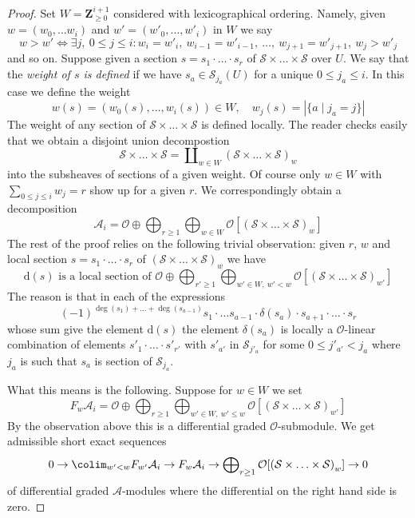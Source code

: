 \begin{proof}
\medskip\noindent
Set $W = \mathbf{Z}_{\geq 0}^{i + 1}$ considered with lexicographical
ordering. Namely, given $w = (w_0, \ldots w_i)$ and
$w' = (w'_0, \ldots, w'_i)$ in $W$ we say
$$
w > w' \Leftrightarrow
\exists j,\ 0 \leq j \leq i :
w_i = w'_i,\ w_{i - 1} = w'_{i - 1},\ \ldots ,
\ w_{j + 1} = w'_{j + 1},\ w_j > w'_j
$$
and so on. Suppose given a section
$s = s_1 \cdot \ldots \cdot s_r$ of
$\mathcal{S} \times \ldots \times \mathcal{S}$
over $U$. We say that the {\it weight of $s$ is defined}
if we have $s_a \in \mathcal{S}_{j_a}(U)$ for a unique
$0 \leq j_a \leq i$. In this case we define the weight
$$
w(s) = (w_0(s), \ldots, w_i(s)) \in W,\quad
w_j(s) = |\{a \mid j_a = j\}|
$$
The weight of any section of $\mathcal{S} \times \ldots \times \mathcal{S}$
is defined locally. The reader checks easily that we obtain a disjoint union
decompostion
$$
\mathcal{S} \times \ldots \times \mathcal{S} =
\coprod\nolimits_{w \in W} \left(
\mathcal{S} \times \ldots \times \mathcal{S}\right)_w
$$
into the subsheaves of sections of a given weight. Of course
only $w \in W$ with $\sum_{0 \leq j \leq i} w_j = r$ show up for a given $r$.
We correspondingly obtain a decomposition
$$
\mathcal{A}_i = \mathcal{O} \oplus
\bigoplus\nolimits_{r \geq 1}
\bigoplus\nolimits_{w \in W}
\mathcal{O}[\left(\mathcal{S} \times \ldots \times \mathcal{S}\right)_w]
$$
The rest of the proof relies on the following trivial observation:
given $r$, $w$ and local section $s = s_1 \cdot \ldots \cdot s_r$ of
$\left(\mathcal{S} \times \ldots \times \mathcal{S}\right)_w$
we have
$$
\text{d}(s) \text{ is a local section of } \mathcal{O} \oplus
\bigoplus\nolimits_{r' \geq 1}
\bigoplus\nolimits_{w' \in W,\ w' < w}
\mathcal{O}[\left(\mathcal{S} \times \ldots \times \mathcal{S}\right)_{w'}]
$$
The reason is that in each of the expressions
$$
(-1)^{\deg(s_1) + \ldots + \deg(s_{a - 1})}
s_1 \cdot \ldots s_{a - 1} \cdot \delta(s_a) \cdot
s_{a + 1} \cdot \ldots \cdot s_r
$$
whose sum give the element $\text{d}(s)$ the element $\delta(s_a)$
is locally a $\mathcal{O}$-linear combination of elements
$s'_1 \cdot \ldots \cdot s'_{r'}$ with $s'_{a'}$ in
$\mathcal{S}_{j'_a}$ for some $0 \leq j'_{a'} < j_a$ where $j_a$ is such that
$s_a$ is section of $\mathcal{S}_{j_a}$.

\medskip\noindent
What this means is the following. Suppose for $w \in W$ we set
$$
F_w \mathcal{A}_i = \mathcal{O} \oplus \bigoplus\nolimits_{r \geq 1}
\bigoplus\nolimits_{w' \in W,\ w' \leq w}
\mathcal{O}[\left(\mathcal{S} \times \ldots \times \mathcal{S}\right)_{w'}]
$$
By the observation above this is a differential graded $\mathcal{O}$-submodule.
We get admissible short exact sequences
$$
0 \to \colim_{w' < w} F_{w'}\mathcal{A}_i \to
F_w\mathcal{A}_i \to
\bigoplus\nolimits_{r \geq 1}
\mathcal{O}[\left(\mathcal{S} \times \ldots \times \mathcal{S}\right)_w]
\to 0
$$
of differential graded $\mathcal{A}$-modules where the differential
on the right hand side is zero.


\end{proof}
